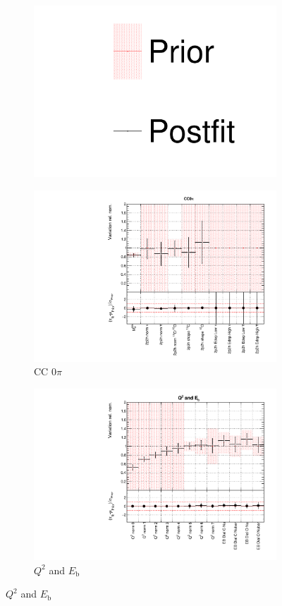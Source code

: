 \begin{figure}[!htbp]
\centering
\begin{subfigure}{0.8\textwidth}
  \centering
  \includegraphics[width=0.25\linewidth]{figs/asmv_leg}
\end{subfigure}
\begin{subfigure}{0.49\textwidth}
  \centering
  \includegraphics[width=0.9\linewidth]{figs/asmvxsecpoly1}
  \caption{CC 0$\pi$}
\end{subfigure}
\begin{subfigure}{0.49\textwidth}
  \centering
  \includegraphics[width=0.9\linewidth]{figs/asmvxsecpoly2}
  \caption{$Q^2$ and $E_{\mathrm{b}}$}
\end{subfigure}

\end{figure}
